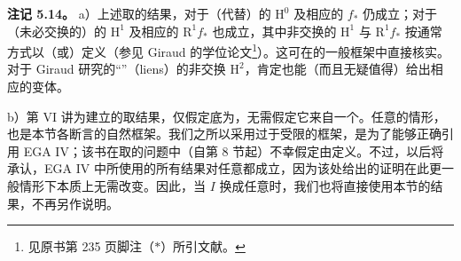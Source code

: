 \textbf{注记 5.14。} a）上述取的结果，对于（代替）的 $\mathrm H^0$ 及相应的 $f_*$ 仍成立；对于（未必交换的）的 $\mathrm H^1$ 及相应的 $\mathrm R^1f_*$ 也成立，其中非交换的 $\mathrm H^1$ 与 $\mathrm R^1f_*$ 按通常方式以（或）定义（参见 Giraud 的学位论文\footnote{见原书第 235 页脚注（$*$）所引文献。}）。这可在的一般框架中直接核实。对于 Giraud 研究的“”（liens）的非交换 $\mathrm H^2$，肯定也能（而且无疑值得）给出相应的变体。

b）第 VI 讲为建立的取结果，仅假定底为，无需假定它来自一个。任意的情形，也是本节各断言的自然框架。我们之所以采用过于受限的框架，是为了能够正确引用 EGA IV；该书在取的问题中（自第 8 节起）不幸假定由定义。不过，以后将承认，EGA IV 中所使用的所有结果对任意都成立，因为该处给出的证明在此更一般情形下本质上无需改变。因此，当 $I$ 换成任意时，我们也将直接使用本节的结果，不再另作说明。
